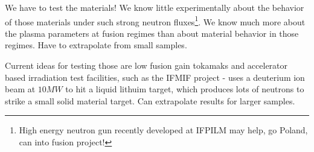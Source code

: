 \documentclass[PlasmaNotes.tex]{subfiles}
\begin{document}
We have to test the materials! We know little experimentally about the behavior of those materials under such strong neutron fluxes\footnote{High energy neutron gun recently developed at IFPILM may help, go Poland, can into fusion project!}. We know much more about the plasma parameters at fusion regimes than about material behavior in those regimes. Have to extrapolate from small samples.

Current ideas for testing those are low fusion gain tokamaks and accelerator based irradiation test facilities, such as the IFMIF project - uses a deuterium ion beam at $10 MW$ to hit a liquid lithuim target, which produces lots of neutrons to strike a small solid material target. Can extrapolate results for larger samples.
\end{document}
